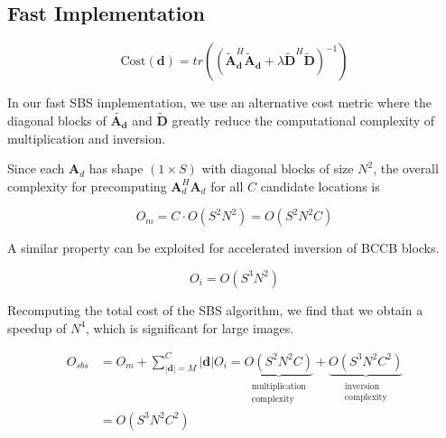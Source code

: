 \documentclass{article}
\begin{document}

\subsection{Fast Implementation}

$$
\text{Cost}(\bm{d}) = tr\left(\left(
\widetilde{\bm A}_{\bm d}^H \widetilde{\bm A}_{\bm d} + \lambda \widetilde{\bm D}^H
\widetilde{\bm D} \right)^{-1} \right)
$$

In our fast SBS implementation, we use an alternative cost metric where the
diagonal blocks of $\widetilde{\bm{A}_{\bm{d}}}$ and $\widetilde{\bm{D}}$ greatly
  reduce the computational complexity of multiplication and inversion.

Since each $\bm{A}_d$ has shape $(1 \times S)$ with diagonal blocks of size $N^2$, the overall complexity for
precomputing $\bm{A}^H_d \bm{A}_d$ for all $C$ candidate locations is

$$
O_m = C \cdot O(S^2N^2) = O(S^2N^2C)
$$

A similar property can be exploited for accelerated inversion of BCCB blocks. \cite{kamaci2017}

$$
O_i = O(S^3N^2)
$$

Recomputing the total cost of the SBS algorithm, we find that we obtain a
speedup of $N^4$, which is significant for large images.

\begin{align*}
  O_{sbs} &= O_m + \sum_{|\bm{d}| = M}^C |\bm{d}| O_i =
  \underbrace{
  O(S^2N^2C)
  }_{\substack{\text{multiplication}\\ \text{complexity}}}
  +
  \underbrace{
  O(S^3N^2C^2)
  }_{\substack{\text{inversion}\\ \text{complexity}}} \\
  &= O(S^3N^2C^2)
\end{align*}
\end{document}
